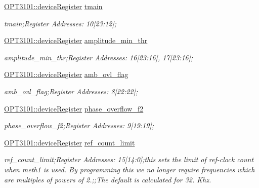 \begin{DoxyCompactItemize}
\mbox{\hyperlink{class_o_p_t3101_1_1device_register}{O\+P\+T3101\+::device\+Register}} \mbox{\hyperlink{class_o_p_t3101_1_1registers_a3dfd8d81d4cb04d274007deb7c6122fc}{tmain}}
\begin{DoxyCompactList}\small\item\em tmain;Register Addresses\+: 10\mbox{[}23\+:12\mbox{]}; \end{DoxyCompactList}\item 
\mbox{\hyperlink{class_o_p_t3101_1_1device_register}{O\+P\+T3101\+::device\+Register}} \mbox{\hyperlink{class_o_p_t3101_1_1registers_abdb9db1e1ff8bda71eccaea718b116d0}{amplitude\+\_\+min\+\_\+thr}}
\begin{DoxyCompactList}\small\item\em amplitude\+\_\+min\+\_\+thr;Register Addresses\+: 16\mbox{[}23\+:16\mbox{]}, 17\mbox{[}23\+:16\mbox{]}; \end{DoxyCompactList}\item 
\mbox{\hyperlink{class_o_p_t3101_1_1device_register}{O\+P\+T3101\+::device\+Register}} \mbox{\hyperlink{class_o_p_t3101_1_1registers_a5ba6f5ef459327f64179b6d405dbd101}{amb\+\_\+ovl\+\_\+flag}}
\begin{DoxyCompactList}\small\item\em amb\+\_\+ovl\+\_\+flag;Register Addresses\+: 8\mbox{[}22\+:22\mbox{]}; \end{DoxyCompactList}\item 
\mbox{\hyperlink{class_o_p_t3101_1_1device_register}{O\+P\+T3101\+::device\+Register}} \mbox{\hyperlink{class_o_p_t3101_1_1registers_a63560e719cf9970bc83879a353b2dc9f}{phase\+\_\+overflow\+\_\+f2}}
\begin{DoxyCompactList}\small\item\em phase\+\_\+overflow\+\_\+f2;Register Addresses\+: 9\mbox{[}19\+:19\mbox{]}; \end{DoxyCompactList}\item 
\mbox{\hyperlink{class_o_p_t3101_1_1device_register}{O\+P\+T3101\+::device\+Register}} \mbox{\hyperlink{class_o_p_t3101_1_1registers_ac5c1fc72abe6fdd9a55ad01fd8116fd3}{ref\+\_\+count\+\_\+limit}}
\begin{DoxyCompactList}\small\item\em ref\+\_\+count\+\_\+limit;Register Addresses\+: 15\mbox{[}14\+:0\mbox{]};this sets the limit of ref-\/clock count when meth1 is used. By programming this we no longer require frequencies which are multiples of powers of 2.;;The default is calculated for 32. Khz. \end{DoxyCompactList}\item 

\end{DoxyCompactItemize}
